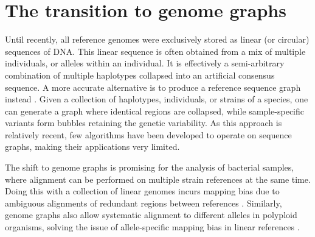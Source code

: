 \section{The transition to genome graphs}

Until recently, all reference genomes were exclusively stored as linear (or circular) sequences of DNA. This linear sequence is often obtained from a mix of multiple individuals, or alleles within an individual. It is effectively a semi-arbitrary combination of multiple haplotypes collapsed into an artificial consensus sequence. A more accurate alternative is to produce a reference sequence graph instead \cite{churchExtendingReferenceAssembly2015}. Given a collection of haplotypes, individuals, or strains of a species, one can generate a graph where identical regions are collapsed, while sample-specific variants form bubbles retaining the genetic variability. As this approach is relatively recent, few algorithms have been developed to operate on sequence graphs, making their applications very limited.

The shift to genome graphs is promising for the analysis of bacterial samples, where alignment can be performed on multiple strain references at the same time. Doing this with a collection of linear genomes incurs mapping bias due to ambiguous alignments of redundant regions between references \cite{liDesignConstructionReference2020}. Similarly, genome graphs also allow systematic alignment to different alleles in polyploid organisms, solving the issue of allele-specific mapping bias in linear references \cite{vandegeijnWASPAllelespecificSoftware2015}. 
